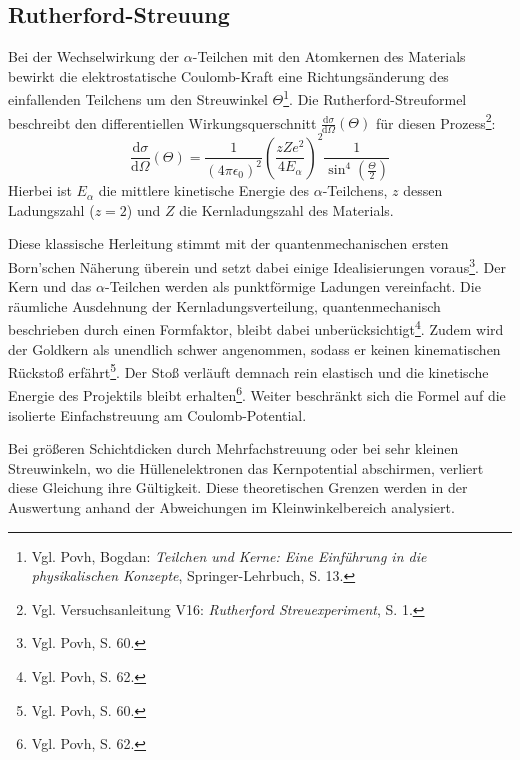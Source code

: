 \subsection{Rutherford-Streuung}
Bei der Wechselwirkung der $\alpha$-Teilchen mit den Atomkernen des Materials bewirkt die elektrostatische Coulomb-Kraft eine Richtungsänderung des einfallenden Teilchens um den Streuwinkel $\Theta$\footnote{Vgl. Povh, Bogdan: \textit{Teilchen und Kerne: Eine Einführung in die physikalischen Konzepte}, Springer-Lehrbuch, S. 13.}. Die Rutherford-Streuformel beschreibt den differentiellen Wirkungsquerschnitt $\frac{\mathrm{d}\sigma}{\mathrm{d}\Omega}(\Theta)$ für diesen Prozess\footnote{Vgl. Versuchsanleitung V16: \textit{Rutherford Streuexperiment}, S. 1.}:
\begin{equation}
    \frac{\mathrm{d}\sigma}{\mathrm{d}\Omega}(\Theta) = \frac{1}{(4\pi\epsilon_0)^2} \left( \frac{z Z e^2}{4 E_\alpha} \right)^2 \frac{1}{\sin^4 \left(\frac{\Theta}{2}\right)}
\label{eq:rutherford}
\end{equation}
Hierbei ist $E_\alpha$ die mittlere kinetische Energie des $\alpha$-Teilchens, $z$ dessen Ladungszahl ($z=2$) und $Z$ die Kernladungszahl des Materials. 

Diese klassische Herleitung stimmt mit der quantenmechanischen ersten Born'schen Näherung überein und setzt dabei einige Idealisierungen voraus\footnote{Vgl. Povh, S. 60.}. Der Kern und das $\alpha$-Teilchen werden als punktförmige Ladungen vereinfacht. Die räumliche Ausdehnung der Kernladungsverteilung, quantenmechanisch beschrieben durch einen Formfaktor, bleibt dabei unberücksichtigt\footnote{Vgl. Povh, S. 62.}. Zudem wird der Goldkern als unendlich schwer angenommen, sodass er keinen kinematischen Rückstoß erfährt\footnote{Vgl. Povh, S. 60.}. Der Stoß verläuft demnach rein elastisch und die kinetische Energie des Projektils bleibt erhalten\footnote{Vgl. Povh, S. 62.}. Weiter beschränkt sich die Formel auf die isolierte Einfachstreuung am Coulomb-Potential.

Bei größeren Schichtdicken durch Mehrfachstreuung oder bei sehr kleinen Streuwinkeln, wo die Hüllenelektronen das Kernpotential abschirmen, verliert diese Gleichung ihre Gültigkeit. Diese theoretischen Grenzen werden in der Auswertung anhand der Abweichungen im Kleinwinkelbereich analysiert.

